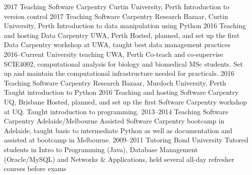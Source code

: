 \documentclass[]{friggeri-cv} %
\begin{document}
\begin{entrylist}
\entry
{2017}
{Teaching Software Carpentry}
{Curtin University, Perth}
{Introduction to version control}
\entry
{2017}
{Teaching Software Carpentry}
{Research Bazaar, Curtin University, Perth}
{Introduction to data manipulation using Python}
\entry
{2016}
{Teaching and hosting Data Carpentry}
{UWA, Perth}
{Hosted, planned, and set up the first Data Carpentry workshop at UWA, taught best data management practices}
\entry
{2016--Current}
{University teaching}
{UWA, Perth}
{Co-teach and co-supervise SCIE4002, computational analysis for biology and biomedical MSc students. Set up and maintain the computational infrastructure needed for practicals.}
\entry
{2016}
{Teaching Software Carpentry}
{Research Bazaar, Murdoch University, Perth}
{Taught introduction to Python}
\entry
{2016}
{Teaching and hosting Software Carpentry}
{UQ, Brisbane}
{Hosted, planned, and set up the first Software Carpentry workshop at UQ. Taught introduction to programming.}
\entry
{2013--2014}
{Teaching Software Carpentry}
{Adelaide/Melbourne}
{Assisted Software Carpentry bootcamp in Adelaide, taught basic to intermediate Python as well as documentation and assisted at bootcamp in Melbourne.}
\entry
{2009--2011}
{Tutoring}
{Bond University}
{Tutored students in Intro to Programming (Java), Database Management (Oracle/MySQL) and Networks \& Applications, held several all-day refresher courses before exams}
\end{entrylist}
\end{document}
